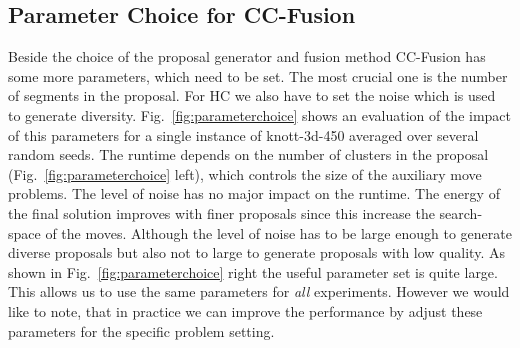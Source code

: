 \documentclass[10pt,twocolumn,letterpaper]{article}
\theoremstyle{definition}
\begin{document}
\subsection{Parameter Choice for CC-Fusion}
Beside the choice of the proposal generator and fusion method CC-Fusion has some more parameters, which need to be set.
The most crucial one is the number of segments in the proposal. For HC we also have to set the noise which is used to generate diversity.
Fig.~\ref{fig:parameterchoice} shows an evaluation of the impact of this parameters for a single instance of knott-3d-450 averaged over several random seeds.
The runtime depends on the number of clusters in the proposal (Fig.~\ref{fig:parameterchoice} left), which controls the size of the auxiliary move problems.
The level of noise has no major impact on the runtime.
The energy of the final solution improves with finer proposals since this increase the search-space of the moves.
Although the level of noise has to be large enough to generate diverse proposals but also not to large to generate proposals with low quality.
As shown in Fig.~\ref{fig:parameterchoice} right the useful parameter set is quite large. This allows us to use the same parameters for \emph{all}
experiments. However we would like to note, that in practice we can improve the performance by adjust these parameters for the specific problem setting.
%
%
\end{document}
